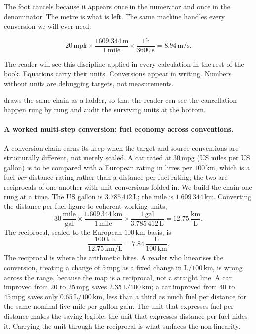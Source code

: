 The foot cancels because it appears once in the numerator and once in
the denominator. The metre is what is left. The same machine handles
every conversion we will ever need:

\[
20 \,\text{mph} \times \frac{1609.344 \,\si{\meter}}{1 \,\text{mile}}
\times \frac{1 \,\si{\hour}}{3600 \,\si{\second}} = 8.94 \,\si
{\meter\per\second}.
\]

The reader will see this discipline applied in every calculation in
the rest of the book. Equations carry their units. Conversions appear
in writing. Numbers without units are debugging targets, not
measurements.

 draws the same chain as a
ladder, so that the reader can see the cancellation happen rung by
rung and audit the surviving units at the bottom.



\paragraph{A worked multi-step conversion: fuel economy across
conventions.} A conversion chain earns its keep when the target and
source conventions are structurally different, not merely scaled. A
car rated at $30 \,\text{mpg}$ (US miles per US gallon) is to be
compared with a European rating in litres per $100 \,\si{\kilo\meter}$,
which is a fuel-\emph{per}-distance rating rather than a
distance-per-fuel rating; the two are reciprocals of one another with
unit conversions folded in. We build the chain one rung at a time.
The US gallon is $3.785\,412 \,\text{L}$; the mile is
$1.609\,344 \,\si{\kilo\meter}$. Converting the distance-per-fuel
figure to coherent working units,
\[
30 \,\frac{\text{mile}}{\text{gal}}
\times \frac{1.609\,344 \,\si{\kilo\meter}}{1 \,\text{mile}}
\times \frac{1 \,\text{gal}}{3.785\,412 \,\text{L}}
= 12.75 \,\frac{\si{\kilo\meter}}{\text{L}}.
\]
The reciprocal, scaled to the European $100 \,\si{\kilo\meter}$ basis,
is
\[
\frac{100 \,\si{\kilo\meter}}{12.75 \,\si{\kilo\meter}/\text{L}}
= 7.84 \,\frac{\text{L}}{100 \,\si{\kilo\meter}}.
\]
The reciprocal is where the arithmetic bites. A reader who linearises
the conversion, treating a change of $5 \,\text{mpg}$ as a fixed
change in $\text{L}/100\,\si{\kilo\meter}$, is wrong across the range,
because the map is a reciprocal, not a straight line. A car improved
from $20$ to $25 \,\text{mpg}$ saves $2.35 \,\text{L}/100\,\si{\kilo
\meter}$; a car improved from $40$ to $45 \,\text{mpg}$ saves only
$0.65 \,\text{L}/100\,\si{\kilo\meter}$, less than a third as much
fuel per distance for the same nominal five-mile-per-gallon gain. The
unit that expresses fuel per distance makes the saving legible; the
unit that expresses distance per fuel hides it. Carrying the unit
through the reciprocal is what surfaces the non-linearity.

